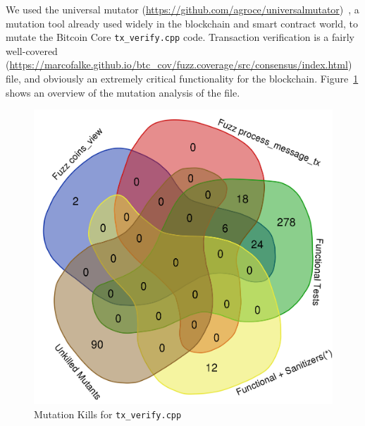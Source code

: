 \begin{sloppypar}
We used the universal mutator
(\url{https://github.com/agroce/universalmutator})~\cite{regexpMut}, a
mutation tool already used widely in the blockchain and smart contract
world, to
mutate the Bitcoin Core {\tt tx\_verify.cpp} code.  Transaction
verification is a fairly well-covered
(\url{https://marcofalke.github.io/btc_cov/fuzz.coverage/src/consensus/index.html})
file, and obviously an extremely critical functionality for the
blockchain.  Figure~\ref{kills} shows an overview of the mutation
analysis of the file.

\begin{figure}
\vspace{2mm}
\includegraphics[width=0.9\columnwidth]{kill_pre_valgrind.png}
\caption{Mutation Kills for {\tt tx\_verify.cpp}}
\label{kills}
\end{figure}


\end{sloppypar}
